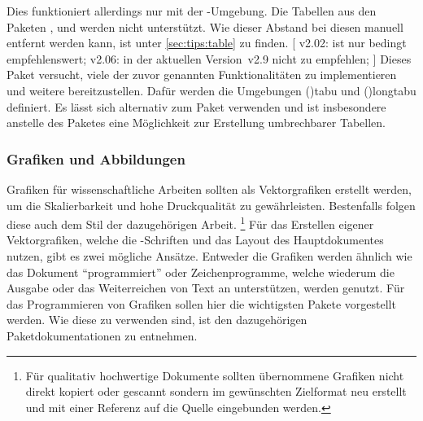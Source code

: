 \begin{DeclarePackages}[Tabellen|?]
  Dies funktioniert allerdings nur mit der -Umgebung. 
  Die Tabellen aus den Paketen ,  und 
   werden nicht unterstützt. Wie dieser Abstand bei diesen 
  manuell entfernt werden kann, ist unter \autoref{sec:tips:table} zu finden.
  [
    v2.02: ist nur bedingt empfehlenswert;
    v2.06: in der aktuellen Version~v2.9 nicht zu empfehlen;
  ]
  Dieses Paket versucht, viele der zuvor genannten Funktionalitäten zu 
  implementieren und weitere bereitzustellen. Dafür werden die Umgebungen 
  \Environment(){tabu} und \Environment(){longtabu} 
  definiert. Es lässt sich alternativ zum Paket  verwenden und 
  ist insbesondere anstelle des Paketes  eine Möglichkeit zur 
  Erstellung umbrechbarer Tabellen.
  
\end{DeclarePackages}



\subsubsection{%
  Grafiken und Abbildungen%
}

Grafiken für wissenschaftliche Arbeiten sollten als Vektorgrafiken erstellt 
werden, um die Skalierbarkeit und hohe Druckqualität zu gewährleisten. 
Bestenfalls folgen diese auch dem Stil der dazugehörigen Arbeit.%
\footnote{%
  Für qualitativ hochwertige Dokumente sollten übernommene Grafiken nicht 
  direkt kopiert oder gescannt sondern im gewünschten Zielformat neu erstellt 
  und mit einer Referenz auf die Quelle eingebunden werden.%
}
Für das Erstellen eigener Vektorgrafiken, welche die -Schriften 
und das Layout des Hauptdokumentes nutzen, gibt es zwei mögliche Ansätze. 
Entweder die Grafiken werden ähnlich wie das Dokument \enquote{programmiert} 
oder Zeichenprogramme, welche wiederum die Ausgabe oder das Weiterreichen von 
Text an  unterstützen, werden genutzt. Für das Programmieren 
von Grafiken sollen hier die wichtigsten Pakete vorgestellt werden. Wie diese 
zu verwenden sind, ist den dazugehörigen Paketdokumentationen zu entnehmen. 

